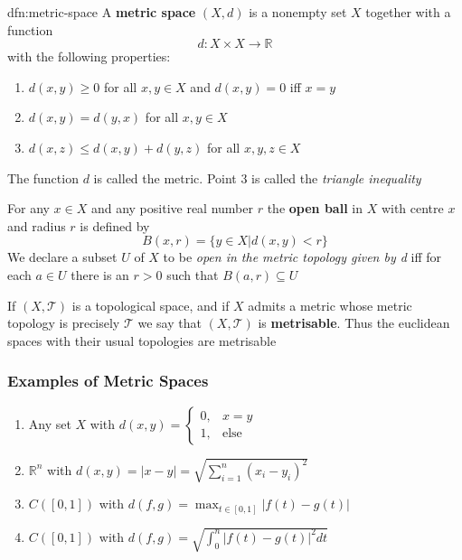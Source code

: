 \documentclass{article}
\begin{document}
\begin{dfn}{dfn:metric-space}{}
    A \textbf{metric space} $(X, d)$ is a nonempty set $X$ together with a function
    \[d : X \times X \to \mathbb{R}\]
    with the following properties:
    \begin{enumerate}
        \item $d(x, y) \ge 0$ for all $x, y\in X$ and $d(x, y) = 0$ iff $x = y$
        \item $d(x, y) = d(y, x)$ for all $x, y \in X$
        \item $d(x, z) \le d(x, y) + d(y, z)$ for all $x,y,z\in X$
    \end{enumerate}
    The function $d$ is called the metric. Point $3$ is called the \textit{triangle inequality}

    \longrule{0.08ex}
    
    For any $x\in X$ and any positive real number $r$ the \textbf{open ball} in $X$ with centre $x$ and radius $r$ is defined by
    \[B(x, r) = \{y\in X | d(x, y) < r\}\]
    We declare a subset $U$ of $X$ to be \textit{open in the metric topology given by d} iff for each $a\in U$ there is an $r > 0$ such that $B(a, r) \subseteq U$

    \longrule{0.08ex}

    If $(X, \mathcal{T})$ is a topological space, and if $X$ admits a metric whose metric topology is precisely $\mathcal{T}$ we say that $(X, \mathcal{T})$ is \textbf{metrisable}. Thus the euclidean spaces with their usual topologies are metrisable
\end{dfn}

\subsubsection{Examples of Metric Spaces}
\begin{enumerate}
    \item Any set $X$ with $d(x, y) = \begin{cases}
            0, & x = y \\
            1, & \text{else}
    \end{cases}$
    \item $\mathbb{R}^{n}$ with $d(x, y) = \lvert x - y \rvert = \sqrt{\sum_{i = 1}^{n} (x_{i} - y_{i})^{2}}$
    \item $C([0,1])$ with $d(f, g) = \max_{t\in[0,1]} \lvert f(t) - g(t) \rvert$
    \item $C([0,1])$ with $d(f, g) = \sqrt{\int_{0}^{n}\lvert f(t) - g(t) \rvert^{2} dt}$
\end{enumerate}
\end{document}
